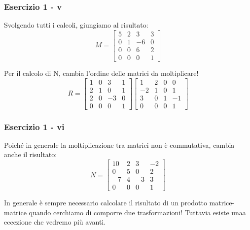 \documentclass{beamer}
\begin{document}
\begin{frame}
\frametitle{Esercizio 1 - v}
Svolgendo tutti i calcoli, giungiamo al risultato:
\begin{displaymath}
    M =
\begin{bmatrix}
   5 &  2 &  3 &  3 \\
   0 &  1 & -6 &  0 \\
   0 &  0 &  6 &  2 \\
   0 &  0 &  0 &  1
\end{bmatrix}
\end{displaymath}

Per il calcolo di N, cambia l'ordine delle matrici da moltiplicare!
\begin{displaymath}
    R =
\begin{bmatrix}
   1 &  0 &  3 &  1 \\
   2 &  1 &  0 &  1 \\
   2 &  0 & -3 &  0 \\
   0 &  0 &  0 &  1 
\end{bmatrix}
\begin{bmatrix}
   1 &  2 &  0 &  0 \\
  -2 &  1 &  0 &  1 \\
   3 &  0 &  1 & -1 \\
   0 &  0 &  0 &  1
\end{bmatrix}
\end{displaymath}

\end{frame}
%
\begin{frame}
\frametitle{Esercizio 1 - vi}
Poich\'e in generale la moltiplicazione tra matrici non \`e commutativa, cambia anche il risultato:
\begin{displaymath}
    N =
\begin{bmatrix}
  10 &  2 &  3 & -2 \\
   0 &  5 &  0 &  2 \\
  -7 &  4 & -3 &  3 \\
   0 &  0 &  0 &  1
\end{bmatrix}
\end{displaymath}

In generale \`e sempre necessario calcolare il risultato di un prodotto matrice-matrice
quando cerchiamo di comporre due trasformazioni! Tuttavia esiste unaa eccezione che vedremo pi\`u avanti.

\end{frame}
%
\end{document}
